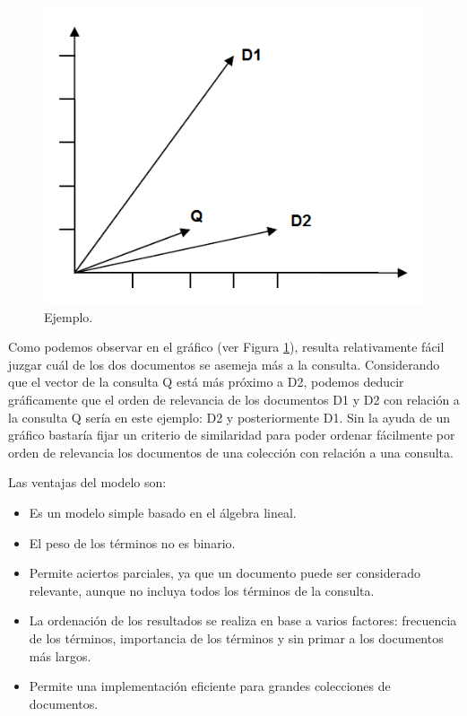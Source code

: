 \documentclass[titlepage]{article}
\begin{document}
\begin{figure}[h]
	\begin{center}
		\includegraphics*[scale=0.5]{grafica.png}
	\end{center}
	\caption{Ejemplo.}
	\label{fig: Figure 7}
\end{figure}

Como podemos observar en el gráfico (ver Figura \ref{fig: Figure 7}), resulta relativamente fácil juzgar cuál de los dos documentos se asemeja más a la consulta. Considerando que el vector de la consulta Q está más próximo a D2, podemos deducir gráficamente que el orden de relevancia de los documentos D1 y D2 con relación a la consulta Q sería en este ejemplo: D2 y posteriormente D1. Sin la ayuda de un gráfico bastaría fijar un criterio de similaridad para poder ordenar fácilmente por orden de relevancia los documentos de una colección con relación a una consulta.

Las ventajas del modelo son:

\begin{itemize}
	\item Es un modelo simple basado en el álgebra lineal. 
	\item El peso de los términos no es binario. 
	\item Permite aciertos parciales, ya que un documento puede ser considerado relevante, aunque no incluya todos los términos de la consulta. 
	\item La ordenación de los resultados se realiza en base a varios factores: frecuencia de los términos, importancia de los términos y sin primar a 	los documentos más largos. 
	\item Permite una implementación eficiente para grandes colecciones de documentos.
\end{itemize}
\end{document}
